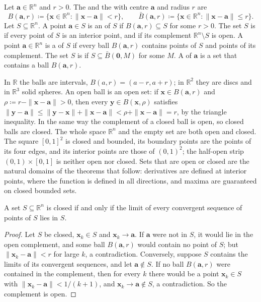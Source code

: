 \begin{definition}
\label{def:open-closed}
Let $\mathbf a\in\mathbb R^n$ and $r>0$. The  and the  with centre $\mathbf a$ and radius $r$ are
\[
B(\mathbf a,r)\coloneqq\{\mathbf x\in\mathbb R^n: \|\mathbf x-\mathbf a\|<r\},\qquad\bar B(\mathbf a,r)\coloneqq\{\mathbf x\in\mathbb R^n: \|\mathbf x-\mathbf a\|\le r\}.
\]
Let $S\subseteq\mathbb R^n$. A point $\mathbf a\in S$ is an  of $S$ if $B(\mathbf a,r)\subseteq S$ for some $r>0$. The set $S$ is  if every point of $S$ is an interior point, and  if its complement $\mathbb R^n\setminus S$ is open. A point $\mathbf a\in\mathbb R^n$ is a  of $S$ if every ball $B(\mathbf a,r)$ contains points of $S$ and points of its complement. The set $S$ is  if $S\subseteq\bar B(\mathbf 0,M)$ for some $M$. A  of $\mathbf a$ is a set that contains a ball $B(\mathbf a,r)$.
\end{definition}

In $\mathbb R$ the balls are intervals, $B(a,r)=(a-r,a+r)$; in $\mathbb R^2$ they are discs and in $\mathbb R^3$ solid spheres. An open ball is an open set: if $\mathbf x\in B(\mathbf a,r)$ and $\rho\coloneqq r-\|\mathbf x-\mathbf a\|>0$, then every $\mathbf y\in B(\mathbf x,\rho)$ satisfies $\|\mathbf y-\mathbf a\|\le\|\mathbf y-\mathbf x\|+\|\mathbf x-\mathbf a\|<\rho+\|\mathbf x-\mathbf a\|=r$, by the triangle inequality. In the same way the complement of a closed ball is open, so closed balls are closed. The whole space $\mathbb R^n$ and the empty set are both open and closed. The square $[0,1]^2$ is closed and bounded, its boundary points are the points of its four edges, and its interior points are those of $(0,1)^2$; the half-open strip $(0,1)\times[0,1]$ is neither open nor closed. Sets that are open or closed are the natural domains of the theorems that follow: derivatives are defined at interior points, where the function is defined in all directions, and maxima are guaranteed on closed bounded sets.

\begin{proposition}
\label{prop:closed-sequences}
A set $S\subseteq\mathbb R^n$ is closed if and only if the limit of every convergent sequence of points of $S$ lies in $S$.
\end{proposition}

\begin{proof}
Let $S$ be closed, $\mathbf x_k\in S$ and $\mathbf x_k\to\mathbf a$. If $\mathbf a$ were not in $S$, it would lie in the open complement, and some ball $B(\mathbf a,r)$ would contain no point of $S$; but $\|\mathbf x_k-\mathbf a\|<r$ for large $k$, a contradiction. Conversely, suppose $S$ contains the limits of its convergent sequences, and let $\mathbf a\notin S$. If no ball $B(\mathbf a,r)$ were contained in the complement, then for every $k$ there would be a point $\mathbf x_k\in S$ with $\|\mathbf x_k-\mathbf a\|<1/(k+1)$, and $\mathbf x_k\to\mathbf a\notin S$, a contradiction. So the complement is open.
\end{proof}

